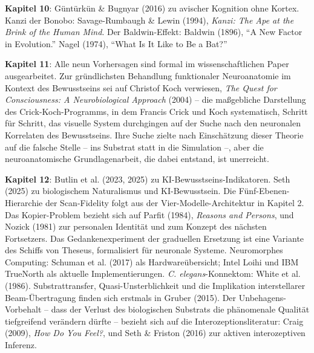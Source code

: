 \documentclass[11pt, twoside, openright]{book}
\begin{document}
\textbf{Kapitel 10}: Güntürkün \& Bugnyar (2016) zu avischer Kognition ohne Kortex. Kanzi der Bonobo: Savage-Rumbaugh \& Lewin (1994), \textit{Kanzi: The Ape at the Brink of the Human Mind}. Der Baldwin-Effekt: Baldwin (1896), ``A New Factor in Evolution.'' Nagel (1974), ``What Is It Like to Be a Bat?''

\textbf{Kapitel 11}: Alle neun Vorhersagen sind formal im wissenschaftlichen Paper ausgearbeitet. Zur gründlichsten Behandlung funktionaler Neuroanatomie im Kontext des Bewusstseins sei auf Christof Koch verwiesen, \textit{The Quest for Consciousness: A Neurobiological Approach} (2004) -- die maßgebliche Darstellung des Crick-Koch-Programms, in dem Francis Crick und Koch systematisch, Schritt für Schritt, das visuelle System durchgingen auf der Suche nach den neuronalen Korrelaten des Bewusstseins. Ihre Suche zielte nach Einschätzung dieser Theorie auf die falsche Stelle -- ins Substrat statt in die Simulation --, aber die neuroanatomische Grundlagenarbeit, die dabei entstand, ist unerreicht.

\textbf{Kapitel 12}: Butlin et al. (2023, 2025) zu KI-Bewusstseins-Indikatoren. Seth (2025) zu biologischem Naturalismus und KI-Bewusstsein. Die Fünf-Ebenen-Hierarchie der Scan-Fidelity folgt aus der Vier-Modelle-Architektur in Kapitel 2. Das Kopier-Problem bezieht sich auf Parfit (1984), \textit{Reasons and Persons}, und Nozick (1981) zur personalen Identität und zum Konzept des nächsten Fortsetzers. Das Gedankenexperiment der graduellen Ersetzung ist eine Variante des Schiffs von Theseus, formalisiert für neuronale Systeme. Neuromorphes Computing: Schuman et al. (2017) als Hardwareübersicht; Intel Loihi und IBM TrueNorth als aktuelle Implementierungen. \textit{C. elegans}-Konnektom: White et al. (1986). Substrattransfer, Quasi-Unsterblichkeit und die Implikation interstellarer Beam-Übertragung finden sich erstmals in Gruber (2015). Der Unbehagens-Vorbehalt -- dass der Verlust des biologischen Substrats die phänomenale Qualität tiefgreifend verändern dürfte -- bezieht sich auf die Interozeptionsliteratur: Craig (2009), \textit{How Do You Feel?}, und Seth \& Friston (2016) zur aktiven interozeptiven Inferenz.
\end{document}
